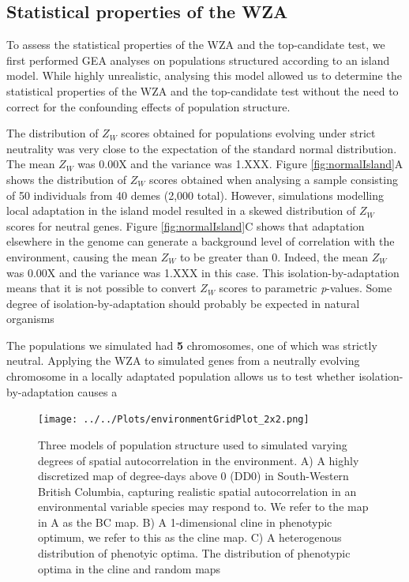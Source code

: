 \documentclass[11pt,twoside,lineno]{GSA_format}
\begin{document}
\subsection{Statistical properties of the WZA}

To assess the statistical properties of the WZA and the top-candidate test, we first performed GEA analyses on populations structured according to an island model. While highly unrealistic, analysing this model allowed us to determine the statistical properties of the WZA and the top-candidate test without the need to correct for the confounding effects of population structure. 

The distribution of $Z_W$ scores obtained for populations evolving under strict neutrality was very close to the expectation of the standard normal distribution. The mean $Z_W$ was 0.00X and the variance was 1.XXX. Figure \ref{fig:normalIsland}A shows the distribution of $Z_W$ scores obtained when analysing a sample consisting of 50 individuals from 40 demes (2,000 total).  However, simulations modelling local adaptation in the island model resulted in a skewed distribution of $Z_W$ scores for neutral genes. Figure \ref{fig:normalIsland}C shows that adaptation elsewhere in the genome can generate a background level of correlation with the environment, causing the mean $Z_W$ to be greater than 0. Indeed, the mean $Z_W$ was 0.00X and the variance was 1.XXX in this case. This isolation-by-adaptation means that it is not possible to convert $Z_W$ scores to parametric \textit{p}-values. 
Some degree of isolation-by-adaptation should probably be expected in natural organisms

The populations we simulated had \textbf{5} chromosomes, one of which was strictly neutral. Applying the WZA to simulated genes from a neutrally evolving chromosome in a locally adaptated population allows us to test whether isolation-by-adaptation causes a 

\begin{figure}
  \texttt{[image: ../../Plots/environmentGridPlot\_2x2.png]}
  \caption{Three models of population structure used to simulated varying degrees of spatial autocorrelation in the environment. A) A highly discretized map of degree-days above 0 (DD0) in South-Western British Columbia, capturing realistic spatial autocorrelation in an environmental variable species may respond to. We refer to the map in A as the BC map. B) A 1-dimensional cline in phenotypic optimum, we refer to this as the cline map. C) A heterogenous distribution of phenotyic optima. The distribution of phenotypic optima in the cline and random maps}
  
  \label{fig:boat1}
\end{figure}
\end{document}
